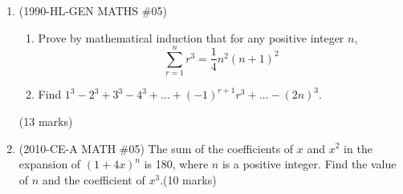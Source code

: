 \documentclass[12pt]{article}
\begin{document}
    \newpage
    \begin{enumerate}
        \item (1990-HL-GEN MATHS \#05)  \begin{enumerate}
            \item Prove by mathematical induction that for any positive integer $n$, $$\sum_{r=1}^{n}r^3=\frac{1}{4}n^2(n+1)^2$$
            \item Find $1^3-2^3+3^3-4^3+\dots+(-1)^{r+1}r^3+\dots-(2n)^3$.
        \end{enumerate}\hfill(13 marks)
        
            \hrulefill
            
            \hrulefill
            
            \hrulefill
            
            \hrulefill
            
            \hrulefill
            
            \hrulefill
            
            \hrulefill
            
            \hrulefill
            
            \hrulefill
            
            \hrulefill
            
            \hrulefill
            
            \hrulefill
            
            \hrulefill
            
            \hrulefill
            
            \hrulefill
            
            \hrulefill
            
            \hrulefill
            
            \hrulefill
            
            \hrulefill
            
            \hrulefill
            
            \hrulefill

        \pagebreak
        \item (2010-CE-A MATH \#05) The sum of the coefficients of $x$ and $x^2$ in the expansion of $(1+4x)^n$ is 180, where $n$ is a positive integer. Find the value of $n$ and the coefficient of $x^3$.\hfill(10 marks)
        
        \hrulefill
            

\end{enumerate}
\end{document}
